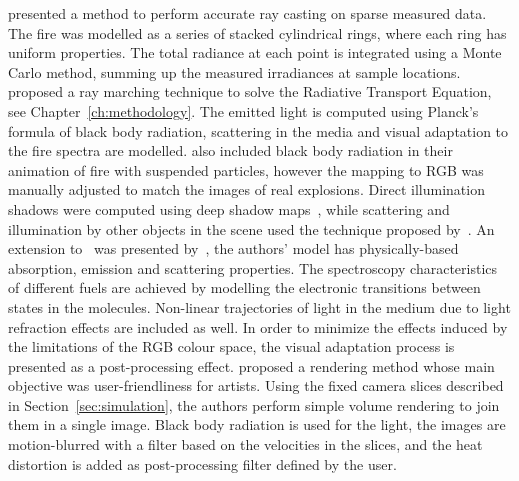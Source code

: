 \cite{Rushmeier:1995} presented a method to perform accurate ray casting on sparse measured data.
The fire was modelled as a series of stacked cylindrical rings, where each ring has uniform properties.
The total radiance at each point is integrated using a Monte Carlo method, summing up the measured irradiances at sample locations. 
\cite{Nguyen:2002} proposed a ray marching technique to solve the Radiative Transport Equation, see Chapter~\ref{ch:methodology}.
The emitted light is computed using Planck's formula of black body radiation, scattering in the media and visual adaptation to the fire spectra are modelled.
\cite{Feldman:2003} also included black body radiation in their animation of fire with suspended particles, however the mapping to RGB was manually adjusted to match the images of real explosions.
Direct illumination shadows were computed using deep shadow maps~\cite{Lokovic:2000}, while scattering and illumination by other objects in the scene used the technique proposed by~\cite{Jensen:2002}.
An extension to~\cite{Nguyen:2002} was presented by~\cite{Pegoraro:2006}, the authors' model has physically-based absorption, emission and scattering properties.
The spectroscopy characteristics of different fuels are achieved by modelling the electronic transitions between states in the molecules.
Non-linear trajectories of light in the medium due to light refraction effects are included as well.
In order to minimize the effects induced by the limitations of the RGB colour space, the visual adaptation process is presented as a post-processing effect.
\cite{Horvath:2009} proposed a rendering method whose main objective was user-friendliness for artists.
Using the fixed camera slices described in Section~\ref{sec:simulation}, the authors perform simple volume rendering to join them in a single image.
Black body radiation is used for the light, the images are motion-blurred with a filter based on the velocities in the slices, and the heat distortion is added as post-processing filter defined by the user. 